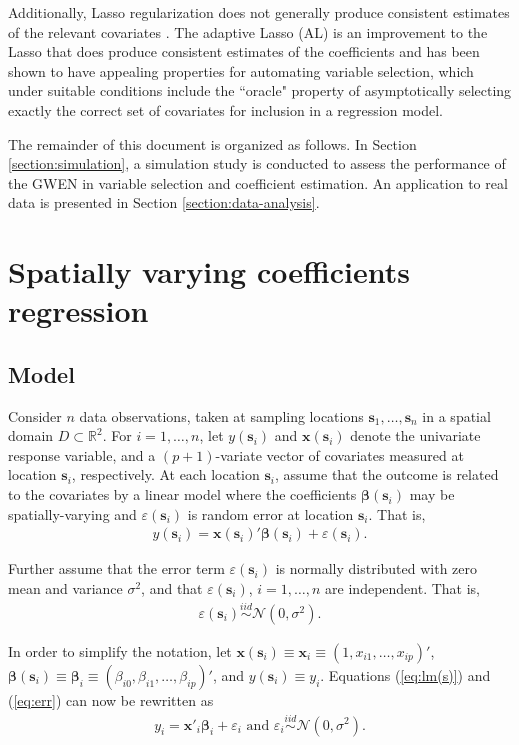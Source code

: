 \documentclass[authoryear, review, 11pt]{elsarticle}
\begin{document}
	Additionally, Lasso regularization does not generally produce consistent estimates of the relevant covariates \citep{Leng-2006}. The adaptive Lasso (AL) \citep{Zou:2006} is an improvement to the Lasso that does produce consistent estimates of the coefficients and has been shown to have appealing properties for automating variable selection, which under suitable conditions include the ``oracle" property of asymptotically selecting exactly the correct set of covariates for inclusion in a regression model.
	
	The remainder of this document is organized as follows. In Section \ref{section:simulation}, a simulation study is conducted to assess the performance of the GWEN in variable selection and coefficient estimation. An application to real data is presented in Section \ref{section:data-analysis}.

\section{Spatially varying coefficients regression \label{section:SVCR}}
	\subsection{Model}	
	Consider $n$ data observations, taken at sampling locations $\bm{s}_1, \dots, \bm{s}_n$ in a spatial domain $D \subset \mathbb{R}^2$. For $i = 1, \dots, n$, let $y(\bm{s}_i)$ and $\bm{x}(\bm{s}_i)$ denote the univariate response variable, and a $(p+1)$-variate vector of covariates measured at location $\bm{s}_i$, respectively. At each location $\bm{s}_i$, assume that the outcome is related to the covariates by a linear model where the coefficients $\bm{\beta}(\bm{s}_i)$ may be spatially-varying and $\varepsilon(\bm{s}_i)$ is random error at location $\bm{s}_i$. That is,
	\begin{align}\label{eq:lm(s)}
		y(\bm{s}_i) = \bm{x}(\bm{s}_i)' \bm{\beta}(\bm{s}_i) + \varepsilon(\bm{s}_i).
	\end{align}
	
	Further assume that the error term $\varepsilon(\bm{s}_i)$ is normally distributed with zero mean and variance $\sigma^2$, and that $\varepsilon(\bm{s}_i)$, $i=1, \dots, n$ are independent. That is,
	\begin{align} \label{eq:err}
		\varepsilon(\bm{s}_i) \overset{iid}{\sim} \mathcal{N} \left( 0,\sigma^2 \right).
	\end{align}
	
	In order to simplify the notation, let $\bm{x}(\bm{s}_i) \equiv \bm{x}_i \equiv \left( 1, x_{i1}, \dots, x_{ip} \right)'$, $\bm{\beta}(\bm{s}_i) \equiv \bm{\beta}_i \equiv \left(\beta_{i0}, \beta_{i1}, \dots, \beta_{ip} \right)'$, and $y(\bm{s}_i) \equiv y_i$.  Equations (\ref{eq:lm(s)}) and (\ref{eq:err}) can now be rewritten as
	\begin{align}
		y_i = \bm{x}'_i \bm{\beta}_i + \varepsilon_i \text{ and } \varepsilon_i \overset{iid}{\sim} \mathcal{N} \left( 0,\sigma^2 \right).
	\end{align}
	
\end{document}
